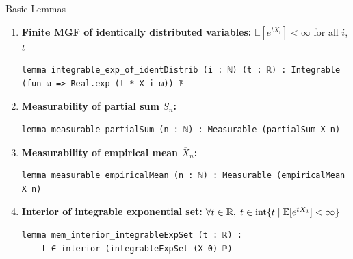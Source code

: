 \documentclass[aspectratio=169]{beamer}
\newcommand{\E}{\mathbb{E}}
\newcommand{\R}{\mathbb{R}}
\begin{document}
\begin{frame}[fragile]{Basic Lemmas}
  \begin{enumerate}
    \item \textbf{Finite MGF of identically distributed variables:} $\E[e^{tX_i}] < \infty$ for all $i$, $t$
\begin{lstlisting}[basicstyle=\ttfamily\tiny]
lemma integrable_exp_of_identDistrib (i : ℕ) (t : ℝ) : Integrable (fun ω => Real.exp (t * X i ω)) ℙ
\end{lstlisting}
    \item \textbf{Measurability of partial sum $S_n$:}
\begin{lstlisting}[basicstyle=\ttfamily\tiny]
lemma measurable_partialSum (n : ℕ) : Measurable (partialSum X n)
\end{lstlisting}
    \item \textbf{Measurability of empirical mean $\overline{X}_n$:}
\begin{lstlisting}[basicstyle=\ttfamily\tiny]
lemma measurable_empiricalMean (n : ℕ) : Measurable (empiricalMean X n)
\end{lstlisting}
    \item \textbf{Interior of integrable exponential set:} $\forall t \in \R,\; t \in \textnormal{int}\{t \mid \E[e^{tX_1}] < \infty\}$
\begin{lstlisting}[basicstyle=\ttfamily\tiny]
lemma mem_interior_integrableExpSet (t : ℝ) :
    t ∈ interior (integrableExpSet (X 0) ℙ)
\end{lstlisting}
  \end{enumerate}
\end{frame}
\end{document}
